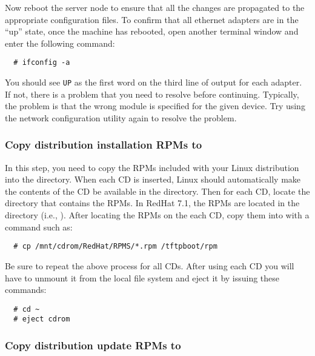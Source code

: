 \endchange

Now reboot the server node to ensure that all the changes are
propagated to the appropriate configuration files. To confirm that all
ethernet adapters are in the ``up'' state, once the machine has
rebooted, open another terminal window and enter the following
command:

\begin{verbatim}
  # ifconfig -a
\end{verbatim}
  
You should see {\tt UP} as the first word on the third line of output
for each adapter. If not, there is a problem that you need to resolve
before continuing. Typically, the problem is that the wrong module is
specified for the given device. Try using the network configuration
utility again to resolve the problem.
  

\subsubsection{Copy distribution installation RPMs to }
\label{det:rpmcopy}

In this step, you need to copy the RPMs included with your Linux
distribution into the  directory.  When each CD is
inserted, Linux should automatically make the contents of the CD be
available in the  directory.  Then for each CD,
locate the directory that contains the RPMs.  In RedHat 7.1, the RPMs
are located in the  directory (i.e.,
).  After locating the RPMs on the each
CD, copy them into  with a command such as:

\begin{verbatim}
  # cp /mnt/cdrom/RedHat/RPMS/*.rpm /tftpboot/rpm
\end{verbatim}
  
Be sure to repeat the above process for all CDs.  After using each CD
you will have to unmount it from the local file system and eject it by
issuing these commands:

\begin{verbatim}
  # cd ~
  # eject cdrom
\end{verbatim}


\subsubsection{Copy distribution update RPMs to }
\label{det:distro-updates}

